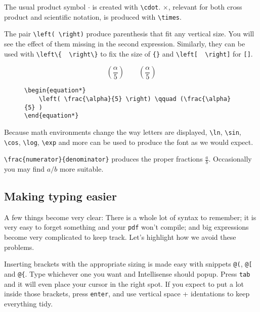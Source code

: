 The usual product symbol \( \cdot \) is created with \verb|\cdot|. \(\times\), relevant for both cross product and scientific notation, is produced with \verb|\times|.

The pair \verb|\left( \right)| produce parenthesis that fit any vertical size.
You will see the effect of them missing in the second expression.
Similarly, they can be used with \verb|\left\{  \right\}| to fix the size of \verb|{}| and \verb|\left[  \right]| for \verb|[]|.
\begin{figure}[h]
\centering
\begin{minipage}{0.40\textwidth}
    \begin{equation*}
        \left( \frac{\alpha}{5} \right) \qquad (\frac{\alpha}{5} )
    \end{equation*}
\end{minipage}
\hfill
\begin{minipage}{0.59\textwidth}
    \begin{lstlisting}
\begin{equation*}
    \left( \frac{\alpha}{5} \right) \qquad (\frac{\alpha}{5} )
\end{equation*}       
\end{lstlisting}    
\end{minipage}
\end{figure}

Because math environments change the way letters are displayed, \verb|\ln|, \verb|\sin|, \verb|\cos|, \verb|\log|, \verb|\exp| and more can be used to produce the font as we would expect. 

\verb|\frac{numerator}{denominator}| produces the proper fractions \( \frac{a}{b} \). Occasionally you may find \( a/b \) more suitable.

\subsection{Making typing easier}
A few things become very clear: There is a whole lot of syntax to remember; it is very easy to forget something and your \texttt{pdf} won't compile; and big expressions become very complicated to keep track.
Let's highlight how we avoid these problems.

Inserting brackets with the appropriate sizing is made easy with snippets \verb|@(|, \verb|@[| and \verb|@{|.
Type whichever one you want and Intellisense should popup.
Press \verb|tab| and it will even place your cursor in the right spot.
If you expect to put a lot inside those brackets, press \texttt{enter}, and use vertical space + identations to keep everything tidy.

